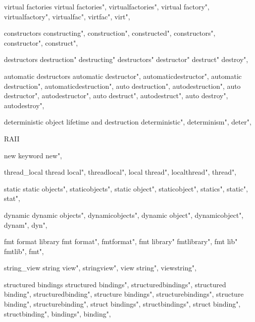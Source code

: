          virtual factories 
        virtual factories",  
        virtualfactories",  
        virtual factory",  
        virtualfactory",  
        virtualfac",  
        virtfac",  
        virt",  
        
         constructors 
        constructing",
        construction",
        constructed",
        constructors",
        constructor",
        construct",
        
         destructors
        destruction" 
        destructing" 
        destructors" 
        destructor" 
        destruct" 
        destroy", 
        
         automatic destructors 
        automatic destructor",  
        automaticdestructor",  
        automatic destruction", 
        automaticdestruction", 
        auto destruction",  
        autodestruction",  
        auto destructor",  
        autodestructor",  
        auto destruct",  
        autodestruct",  
        auto destroy",  
        autodestroy",  
        
         deterministic object lifetime and destruction
        deterministic",  
        determinism",  
        deter",  
        
         RAII 
        
         new keyword 
        new",
        
         thread_local
        thread local",
        threadlocal",
        local thread",
        localthread",
        thread",
        
         static 
        static objects",
        staticobjects",
        static object",
        staticobject",
        statics",
        static",
        stat", 
        
         dynamic 
        dynamic objects",
        dynamicobjects",
        dynamic object",
        dynamicobject",
        dynam",
        dyn",
        
         fmt format library
        fmt format",
        fmtformat",
        fmt library"
        fmtlibrary",
        fmt lib"
        fmtlib",
        fmt",
          
         string_view
        string view",
        stringview",
        view string",
        viewstring",
        
         structured bindings
        structured bindings",
        structuredbindings",
        structured binding",
        structuredbinding", 
        structure bindings",
        structurebindings", 
        structure binding", 
        structurebinding",
        struct bindings",
        structbindings",
        struct binding",
        structbinding",
        bindings",
        binding",
        
